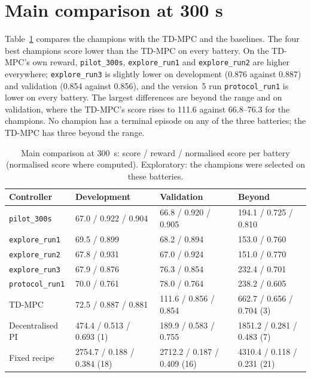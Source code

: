\section{Main comparison at 300 s}
\label{sec:mill-main}
Table~\ref{tab:mill-main} compares the champions with the TD-MPC and the
baselines. The four best champions score lower than the TD-MPC on every
battery. On the TD-MPC's own reward, \texttt{pilot\_300s},
\texttt{explore\_run1} and \texttt{explore\_run2} are higher everywhere;
\texttt{explore\_run3} is slightly lower on development (0.876 against 0.887)
and validation (0.854 against 0.856), and the version~5 run
\texttt{protocol\_run1} is lower on every battery. The largest
differences are beyond the range and on validation, where the TD-MPC's score
rises to 111.6 against 66.8--76.3 for the champions. No champion has a
terminal episode on any of the three batteries; the TD-MPC has three beyond
the range.

\begin{table}[tb]
  \centering
  \caption{Main comparison at 300~s: score / reward / normalised score per
    battery (normalised score where computed). Exploratory: the champions were
    selected on these batteries.}
  \label{tab:mill-main}
  \footnotesize\setlength{\tabcolsep}{2pt}
  \begin{tabular}{@{}llll@{}}
    \toprule
    Controller & Development & Validation & Beyond \\
    \midrule
    \texttt{pilot\_300s}    & 67.0 / 0.922 / 0.904 & 66.8 / 0.920 / 0.905 & 194.1 / 0.725 / 0.810 \\
    \texttt{explore\_run1}  & 69.5 / 0.899         & 68.2 / 0.894         & 153.0 / 0.760 \\
    \texttt{explore\_run2}  & 67.8 / 0.931         & 67.0 / 0.924         & 151.0 / 0.770 \\
    \texttt{explore\_run3}  & 67.9 / 0.876         & 76.3 / 0.854         & 232.4 / 0.701 \\
    \texttt{protocol\_run1} & 70.0 / 0.761         & 78.0 / 0.764         & 238.2 / 0.605 \\
    TD-MPC                  & 72.5 / 0.887 / 0.881 & 111.6 / 0.856 / 0.854 & 662.7 / 0.656 / 0.704 (3) \\
    Decentralised PI        & 474.4 / 0.513 / 0.693 (1) & 189.9 / 0.583 / 0.755 & 1851.2 / 0.281 / 0.483 (7) \\
    Fixed recipe            & 2754.7 / 0.188 / 0.384 (18) & 2712.2 / 0.187 / 0.409 (16) & 4310.4 / 0.118 / 0.231 (21) \\
    \bottomrule
  \end{tabular}
\end{table}

